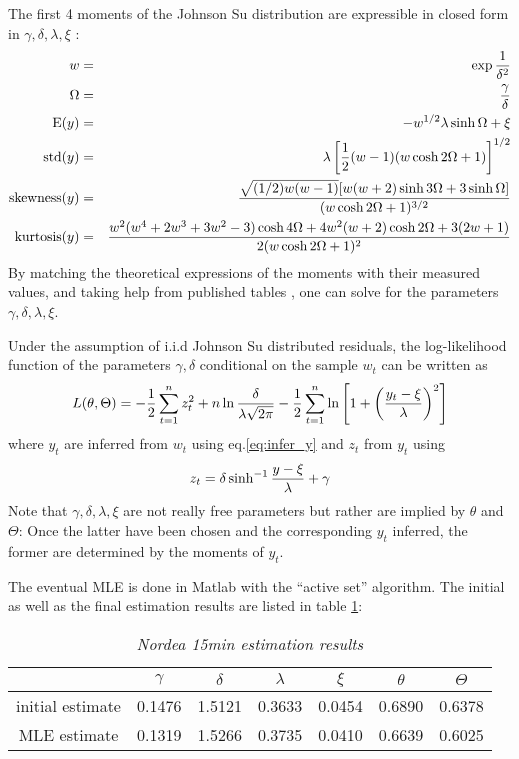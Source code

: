 The first 4 moments of the Johnson Su distribution are expressible
in closed form in $\gamma, \delta, \lambda, \xi$ \cite{Shang2004}:
\begin{eqnarray*}
  w &=& \exp{1 \over \delta^2} \\
  \Omega &=& {\gamma \over \delta} \\
  \text{E}(y) &=& -w^{1/2} \lambda \sinh\Omega + \xi\\
  \text{std}(y) &=& \lambda \left[{1 \over 2}(w-1)(w\cosh 2\Omega +
    1)\right]^{1/2} \\
  \text{skewness}(y) &=& {
    \sqrt{(1/2)w(w-1)} [w(w+2)\sinh 3\Omega + 3\sinh\Omega]
    \over
    (w\cosh 2\Omega + 1)^{3/2}} \\
  \text{kurtosis}(y) &=& {
    w^2(w^4 + 2w^3 + 3w^2 - 3)\cosh 4\Omega + 4w^2 (w+2) \cosh 2\Omega
    + 3(2w+1) \over
    2(w\cosh 2\Omega + 1)^2 }
\end{eqnarray*}
By matching the theoretical expressions of the moments with their
measured values, and taking help from published tables
\cite{Johnson1965}, one can solve for the parameters $\gamma, \delta,
\lambda, \xi$.

Under the assumption of i.i.d Johnson Su distributed residuals, the
log-likelihood function of the parameters $\gamma, \delta$
conditional on the sample $w_t$ can be written as
\[
L(\theta, \Theta) = -{1 \over 2}\sum_{t=1}^n z_t^2 + n \ln{\delta
  \over \lambda \sqrt{2\pi}} - {1 \over 2}\sum_{t=1}^n \ln\left[
  1 + \left({y_t - \xi \over \lambda}\right)^2
\right]
\]
where $y_t$ are inferred from $w_t$ using eq.\ref{eq:infer_y}
and $z_t$ from $y_t$ using
\[
z_t = \delta \sinh^{-1}{y - \xi \over \lambda} + \gamma
\]
Note that $\gamma, \delta, \lambda, \xi$ are not really free
parameters but rather are implied by $\theta$ and $\Theta$: Once the
latter have been chosen and the corresponding $y_t$ inferred, the
former are determined by the moments of $y_t$.

The eventual MLE is done in Matlab with the ``active set''
algorithm. The initial as well as the final estimation results are
listed in table \ref{tab:nordea_15min_js_param}:
\begin{table}[htb!]
  \centering
  \begin{tabular}{|c|c|c|c|c|c|c|}
    \hline
    & $\gamma$ & $\delta$ & $\lambda$ & $\xi$ & $\theta$ & $\Theta$ \\
    \hline
    initial estimate & 0.1476 & 1.5121 & 0.3633 & 0.0454 & 0.6890 &
    0.6378 \\
    \hline
    MLE estimate & 0.1319 & 1.5266 & 0.3735 & 0.0410 & 0.6639 & 0.6025
    \\
    \hline
  \end{tabular}
  \caption{\small \it Nordea 15min estimation results}
  \label{tab:nordea_15min_js_param}
\end{table}


